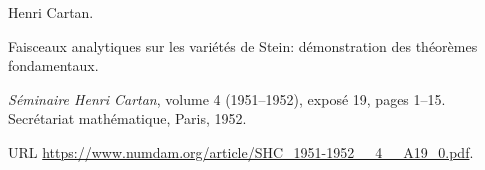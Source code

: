 Henri Cartan.

\newblock Faisceaux analytiques sur les vari{\'e}t{\'e}s de {Stein}:
  d{\'e}monstration des th{\'e}or{\`e}mes fondamentaux.

\newblock \emph{S{\'e}minaire Henri Cartan}, volume 4 (1951--1952), expos{\'e} 19, pages 1--15. Secr{\'e}tariat math{\'e}matique, Paris, 1952.

\newblock URL \url{https://www.numdam.org/article/SHC_1951-1952__4__A19_0.pdf}.

